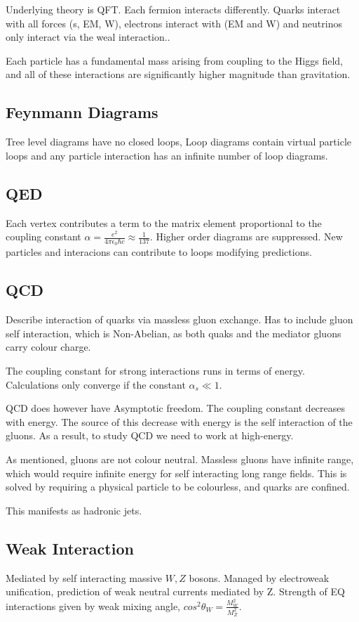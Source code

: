 \documentclass[]{article}
\begin{document}
Underlying theory is QFT. Each fermion interacts differently. Quarks interact with all forces (s, EM, W), electrons interact with (EM and W) and neutrinos only interact via the weal interaction..

Each particle has a fundamental mass arising from coupling to the Higgs field, and all of these interactions are significantly higher magnitude than gravitation.


\subsection{Feynmann Diagrams}
Tree level diagrams have no closed loops, Loop diagrams contain virtual particle loops and any particle interaction has an infinite number of loop diagrams.

\subsection{QED}
Each vertex contributes a term to the matrix element proportional to the coupling constant $\alpha = \frac{e^2}{4\pi\epsilon_0\hbar c} \approx\frac{1}{137}$. Higher order diagrams are suppressed. New particles and interacions can contribute to loops modifying predictions.

\subsection{QCD}
Describe interaction of quarks via massless gluon exchange. Has to include gluon self interaction, which is Non-Abelian, as both quaks and the mediator gluons carry colour charge. 

The coupling constant for strong interactions runs in terms of energy. Calculations only converge if the constant $\alpha_s \ll 1$.

QCD does however have Asymptotic freedom. The coupling constant decreases with energy. The source of this decrease with energy is the self interaction of the gluons. As a result, to study QCD we need to work at high-energy.

As mentioned, gluons are not colour neutral. Massless gluons have infinite range, which would require infinite energy for self interacting long range fields. This is solved by requiring a physical particle to be colourless, and quarks are confined. 

This manifests as hadronic jets.

\subsection{Weak Interaction}
Mediated by self interacting massive $W, Z$ bosons. Managed by electroweak unification, prediction of weak neutral currents mediated by Z. Strength of EQ interactions given by weak mixing angle, $cos^2\theta_W = \frac{M_W^2}{M_Z^2}$.
\end{document}

